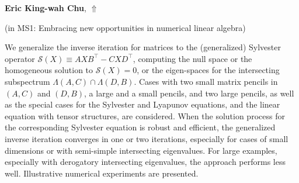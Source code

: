 \documentclass[ILAS2025-program.tex]{subfiles}
\begin{document}
\hypertarget{down0304}{}\begin{ilasabstract}
    
\textbf{Eric King-wah Chu},  \hfill \hyperlink{up0304}{$\Uparrow$}
    
    
(in {\color{mstitle}MS1: Embracing new opportunities in numerical linear algebra})
        
\mtskip
    We generalize the inverse iteration for matrices  to the (generalized) Sylvester operator $\mathcal{S}(X) \equiv AXB^\top - CXD^\top$, computing the null space or the homogeneous solution to $\mathcal{S}(X)=0$, or the eigen-spaces for the intersecting subspectrum $\Lambda (A, C) \cap \Lambda (D,B)$. Cases with two small matrix pencils in $(A,C)$ and $(D,B)$, a large and a small pencils, and two large pencils, as well as the special cases for the Sylvester and Lyapunov equations, and the linear equation with tensor structures, are  considered. When the solution process for the corresponding Sylvester equation is robust and efficient, the generalized inverse iteration converges in one or two iterations, especially for cases of small dimensions or with semi-simple intersecting eigenvalues. For large examples, especially with derogatory intersecting eigenvalues, the approach performs less well. Illustrative numerical experiments are presented.

\end{ilasabstract}
    
\end{document}

